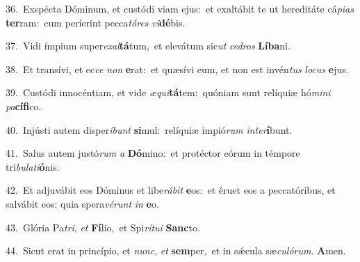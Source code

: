 {\numbfont\textcolor{\numbcolor}{36.}}~Exspécta Dóminum, et custódi viam ejus:~\dagger et exaltábit te ut hereditáte cá\-\textit{pi}\-\textit{as} \textbf{ter}\-ram:~\star cum períerint pecca\-\textit{tó}\-\textit{res} \textit{vi}\-\textbf{dé}bis.\par
{\numbfont\textcolor{\numbcolor}{37.}}~Vidi ímpium super\-\textit{ex}\-\textit{al}\textbf{tá}tum,~\star et elevátum sic\textit{ut} \textit{ce}\-\textit{dros} \textbf{Lí}\-\textbf{ba}ni.\par
{\numbfont\textcolor{\numbcolor}{38.}}~Et transívi, et ec\textit{ce} \textit{non} \textbf{e}\-rat:~\star et quæsívi eum, et non est invén\textit{tus} \textit{lo}\-\textit{cus} \textbf{e}\-jus.\par
{\numbfont\textcolor{\numbcolor}{39.}}~Custódi innocéntiam, et vide \textit{æ}\-\textit{qui}\textbf{tá}tem:~\star quóniam sunt relíquiæ hó\-\textit{mi}\-\textit{ni} \textit{pa}\-\textbf{cí}\textbf{fi}co.\par
{\numbfont\textcolor{\numbcolor}{40.}}~Injústi autem disper\-\textit{í}\-\textit{bunt} \textbf{si}\-mul:~\star relíquiæ impió\textit{rum} \textit{in}\-\textit{ter}\textbf{í}bunt.\par
{\numbfont\textcolor{\numbcolor}{41.}}~Salus autem justó\textit{rum} \textit{a} \textbf{Dó}\-mino:~\star et protéctor eórum in témpore tri\-\textit{bu}\-\textit{la}\textit{ti}\textbf{ó}nis.\par
{\numbfont\textcolor{\numbcolor}{42.}}~Et adjuvábit eos Dóminus et libe\-\textit{rá}\-\textit{bit} \textbf{e}\-os:~\star et éruet eos a peccatóribus, et salvábit eos: quia spera\-\textit{vé}\-\textit{runt} \textit{in} \textbf{e}\-o.\par
{\numbfont\textcolor{\numbcolor}{43.}}~Glória Pa\-\textit{tri}\-, \textit{et} \textbf{Fí}\-lio,~\star et Spi\-\textit{rí}\-\textit{tu}\textit{i} \textbf{Sanc}\-to.\par
{\numbfont\textcolor{\numbcolor}{44.}}~Sicut erat in princípio, et \textit{nunc}\-, \textit{et} \textbf{sem}\-per,~\star et in sǽcula sæ\-\textit{cu}\-\textit{ló}\textit{rum}. \textbf{A}\-men.\par
